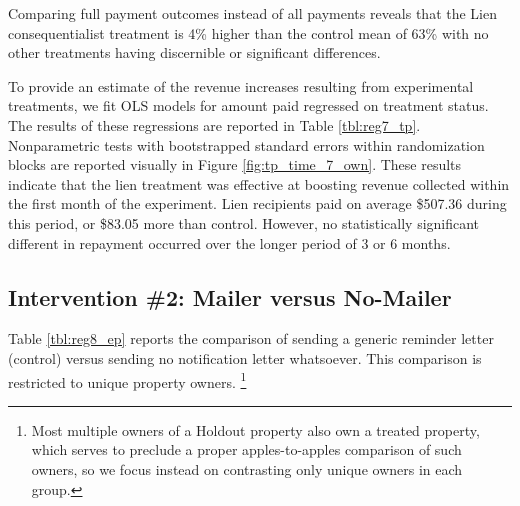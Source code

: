 \documentclass[12pt,titlepage]{article}
\begin{document}
Comparing full payment 
outcomes instead of all payments reveals that the Lien consequentialist 
treatment is 4\% higher than the control mean of 63\% with no other 
treatments having discernible or significant differences.

To provide an estimate of the revenue increases resulting from experimental 
treatments, we fit OLS models for amount paid regressed on treatment status.
The results of these regressions are reported in 
Table \ref{tbl:reg7_tp}. Nonparametric tests with bootstrapped standard errors within 
randomization blocks are reported visually in Figure \ref{fig:tp_time_7_own}. 
These results indicate that the lien treatment was effective at boosting 
revenue collected within the first month of the experiment. Lien recipients 
paid on average \$507.36 during this period, or \$83.05 more than control. However, no statistically 
significant different in repayment occurred over the longer period of 3 or 6 months.


\subsection{Intervention \#2: Mailer versus No-Mailer}

Table \ref{tbl:reg8_ep} reports the comparison of sending a generic reminder letter 
(control) versus sending no notification letter whatsoever. This 
comparison is restricted to unique property owners.
\footnote{
	Most multiple owners of a Holdout property also own a treated property, which
	serves to preclude a proper apples-to-apples comparison of such owners, so
	we focus instead on contrasting only unique owners in each group.
}
\end{document}
